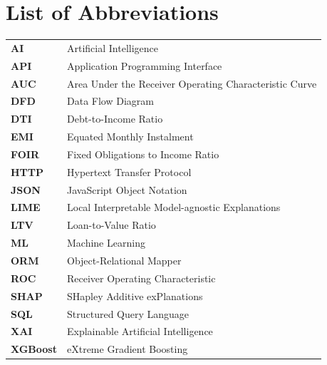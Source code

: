 \chapter*{List of Abbreviations}
\begin{longtable}{>{\bfseries}p{2.6cm}p{11cm}}
AI & Artificial Intelligence\\
API & Application Programming Interface\\
AUC & Area Under the Receiver Operating Characteristic Curve\\
DFD & Data Flow Diagram\\
DTI & Debt-to-Income Ratio\\
EMI & Equated Monthly Instalment\\
FOIR & Fixed Obligations to Income Ratio\\
HTTP & Hypertext Transfer Protocol\\
JSON & JavaScript Object Notation\\
LIME & Local Interpretable Model-agnostic Explanations\\
LTV & Loan-to-Value Ratio\\
ML & Machine Learning\\
ORM & Object-Relational Mapper\\
ROC & Receiver Operating Characteristic\\
SHAP & SHapley Additive exPlanations\\
SQL & Structured Query Language\\
XAI & Explainable Artificial Intelligence\\
XGBoost & eXtreme Gradient Boosting
\end{longtable}
